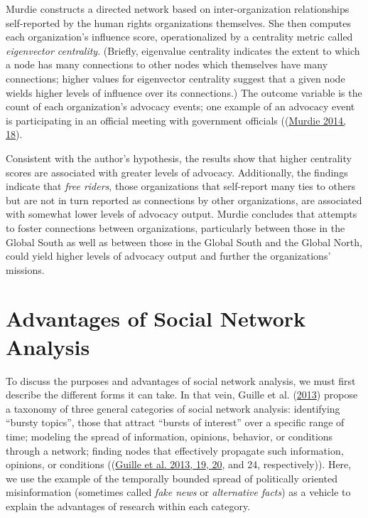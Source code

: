 \documentclass{book}
\begin{document}
Murdie constructs a directed network based on inter-organization relationships
self-reported by the human rights organizations themselves. She then computes
each organization's influence score, operationalized by a centrality metric
called \emph{eigenvector centrality}. (Briefly, eigenvalue centrality
indicates the extent to which a node has many connections to other nodes which
themselves have many connections; higher values for eigenvector centrality
suggest that a given node wields higher levels of influence over its
connections.) The outcome variable is the count of each organization's
advocacy events; one example of an advocacy event is participating in an
official meeting with government officials
((\protect\hyperlink{ref-Murdie2014}{Murdie 2014, 18}).

Consistent with the author's hypothesis, the results show that higher
centrality scores are associated with greater levels of advocacy.
Additionally, the findings indicate that \emph{free riders}, those
organizations that self-report many ties to others but are not in turn
reported as connections by other organizations, are associated with somewhat
lower levels of advocacy output. Murdie concludes that attempts to foster
connections between organizations, particularly between those in the Global
South as well as between those in the Global South and the Global North, could
yield higher levels of advocacy output and further the organizations'
missions.

\hypertarget{advantages-of-social-network-analysis}{%
\section{Advantages of Social Network
Analysis}\label{advantages-of-social-network-analysis}}

To discuss the purposes and advantages of social network analysis, we must
first describe the different forms it can take. In that vein, Guille et al.
(\protect\hyperlink{ref-GuilleEtAl2013}{2013}) propose a taxonomy of three
general categories of social network analysis: identifying ``bursty topics'',
those that attract ``bursts of interest'' over a specific range of time;
modeling the spread of information, opinions, behavior, or conditions through
a network; finding nodes that effectively propagate such information,
opinions, or conditions ((\protect\hyperlink{ref-GuilleEtAl2013}{Guille et al.
2013, 19, 20}, and 24, respectively)). Here, we use the example of the
temporally bounded spread of politically oriented misinformation (sometimes
called \emph{fake news} or \emph{alternative facts}) as a vehicle to explain
the advantages of research within each category.
\end{document}
